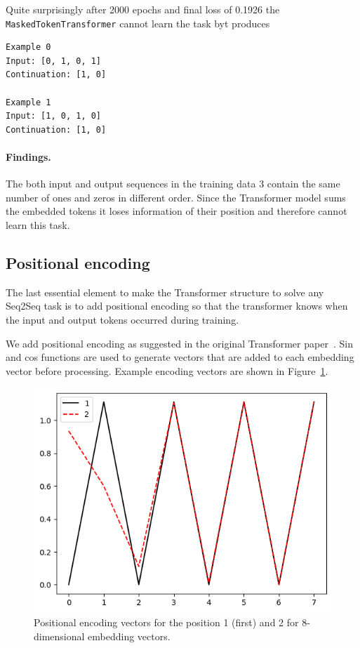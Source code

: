 \documentclass[final]{article}
\begin{document}
Quite surprisingly after 2000 epochs and final loss of 0.1926 the \texttt{MaskedTokenTransformer} cannot learn the task byt produces
\begin{verbatim}
Example 0
Input: [0, 1, 0, 1]
Continuation: [1, 0]

Example 1
Input: [1, 0, 1, 0]
Continuation: [1, 0]
\end{verbatim}

\paragraph{Findings.}
The both input and output sequences in the training data 3 contain the same number of ones and zeros in different order. Since the Transformer model sums the embedded tokens it loses information of their position and therefore cannot learn this task.

\subsection{Positional encoding}
The last essential element to make the Transformer structure to solve any Seq2Seq task is to add positional encoding so that the transformer knows when the input and output tokens occurred during training.

We add positional encoding as suggested in the original Transformer paper~\cite{transformer}. Sin and cos functions are used to generate vectors that are added to each embedding vector before processing. Example encoding vectors are shown in Figure~\ref{fig:posencoding}.

\begin{figure}[h]
  \begin{center}
  \includegraphics[width=0.5\linewidth]{posencoding.png}
  \caption{Positional encoding vectors for the position 1 (first) and 2 for 8-dimensional embedding vectors.}
  \label{fig:posencoding}
  \end{center}
\end{figure}
\end{document}
